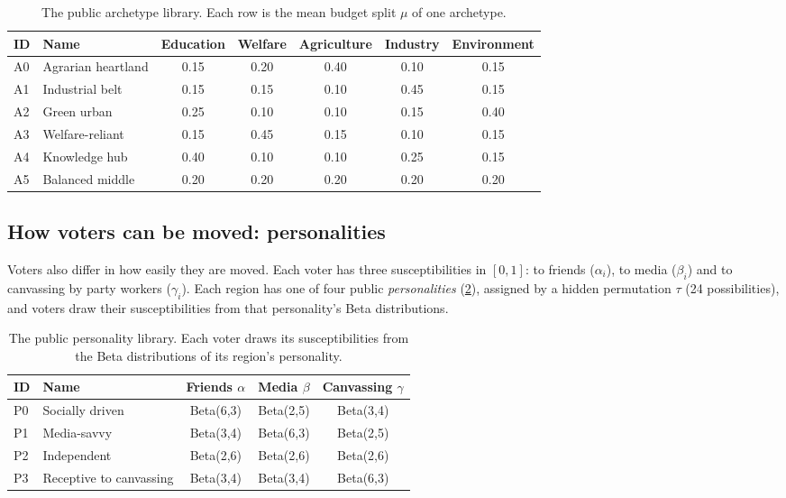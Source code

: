 \documentclass[11pt,a4paper,oneside]{report}
\begin{document}
\begin{table}[t]
\centering
\caption{The public archetype library. Each row is the mean budget split $\mu$ of one archetype.}
\label{tab:archetypes}
\small
\begin{tabular}{@{}llccccc@{}}
\toprule
ID & Name & Education & Welfare & Agriculture & Industry & Environment \\
\midrule
A0 & Agrarian heartland & 0.15 & 0.20 & 0.40 & 0.10 & 0.15 \\
A1 & Industrial belt    & 0.15 & 0.15 & 0.10 & 0.45 & 0.15 \\
A2 & Green urban        & 0.25 & 0.10 & 0.10 & 0.15 & 0.40 \\
A3 & Welfare-reliant    & 0.15 & 0.45 & 0.15 & 0.10 & 0.15 \\
A4 & Knowledge hub      & 0.40 & 0.10 & 0.10 & 0.25 & 0.15 \\
A5 & Balanced middle    & 0.20 & 0.20 & 0.20 & 0.20 & 0.20 \\
\bottomrule
\end{tabular}
\end{table}

\subsection{How voters can be moved: personalities}

Voters also differ in how easily they are moved. Each voter has three susceptibilities in $[0,1]$: to
friends ($\alpha_i$), to media ($\beta_i$) and to canvassing by party workers ($\gamma_i$). Each region has
one of four public \emph{personalities} (\cref{tab:personalities}), assigned by a hidden permutation
$\tau$ (24 possibilities), and voters draw their susceptibilities from that personality's Beta
distributions.

\begin{table}[t]
\centering
\caption{The public personality library. Each voter draws its susceptibilities from the Beta distributions
of its region's personality.}
\label{tab:personalities}
\small
\begin{tabular}{@{}llccc@{}}
\toprule
ID & Name & Friends $\alpha$ & Media $\beta$ & Canvassing $\gamma$ \\
\midrule
P0 & Socially driven         & Beta(6,3) & Beta(2,5) & Beta(3,4) \\
P1 & Media-savvy             & Beta(3,4) & Beta(6,3) & Beta(2,5) \\
P2 & Independent             & Beta(2,6) & Beta(2,6) & Beta(2,6) \\
P3 & Receptive to canvassing & Beta(3,4) & Beta(3,4) & Beta(6,3) \\
\bottomrule
\end{tabular}
\end{table}
\end{document}
